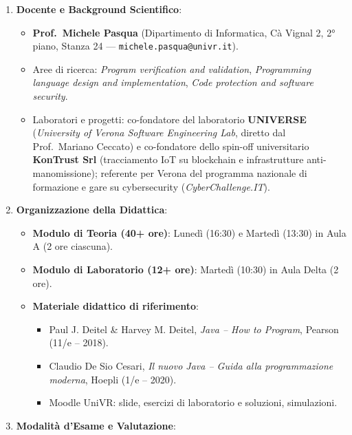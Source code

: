 \documentclass[11pt,a4paper,oneside]{report}
\newcommand{\passthrough}[1]{#1}
\providecommand{\tightlist}{\setlength{\itemsep}{0pt}\setlength{\parskip}{0pt}}
\begin{document}
\begin{enumerate}
\def\labelenumi{\arabic{enumi}.}
\tightlist
\item
  \textbf{Docente e Background Scientifico}:

  \begin{itemize}
  \tightlist
  \item
    \textbf{Prof.~Michele Pasqua} (Dipartimento di Informatica, Cà
    Vignal 2, 2° piano, Stanza 24 ---
    \passthrough{\lstinline!michele.pasqua@univr.it!}).
  \item
    Aree di ricerca: \emph{Program verification and validation},
    \emph{Programming language design and implementation}, \emph{Code
    protection and software security}.
  \item
    Laboratori e progetti: co-fondatore del laboratorio
    \textbf{UNIVERSE} (\emph{University of Verona Software Engineering
    Lab}, diretto dal Prof.~Mariano Ceccato) e co-fondatore dello
    spin-off universitario \textbf{KonTrust Srl} (tracciamento IoT su
    blockchain e infrastrutture anti-manomissione); referente per Verona
    del programma nazionale di formazione e gare su cybersecurity
    (\emph{CyberChallenge.IT}).
  \end{itemize}
\item
  \textbf{Organizzazione della Didattica}:

  \begin{itemize}
  \tightlist
  \item
    \textbf{Modulo di Teoria (40+ ore)}: Lunedì (16:30) e Martedì
    (13:30) in Aula A (2 ore ciascuna).
  \item
    \textbf{Modulo di Laboratorio (12+ ore)}: Martedì (10:30) in Aula
    Delta (2 ore).
  \item
    \textbf{Materiale didattico di riferimento}:

    \begin{itemize}
    \tightlist
    \item
      Paul J. Deitel \& Harvey M. Deitel, \emph{Java -- How to Program},
      Pearson (11/e -- 2018).
    \item
      Claudio De Sio Cesari, \emph{Il nuovo Java -- Guida alla
      programmazione moderna}, Hoepli (1/e -- 2020).
    \item
      Moodle UniVR: slide, esercizi di laboratorio e soluzioni,
      simulazioni.
    \end{itemize}
  \end{itemize}
\item
  \textbf{Modalità d'Esame e Valutazione}:


\end{enumerate}
\end{document}
